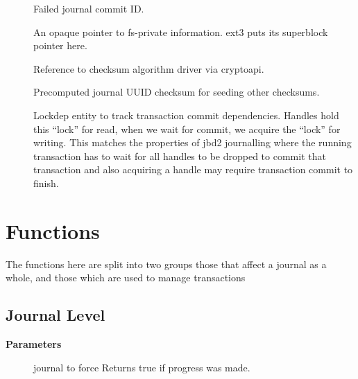 \documentclass[a4paper,8pt,english]{sphinxmanual}
\begin{document}
\begin{description}
\item[{}] \leavevmode
Failed journal commit ID.

\item[{}] \leavevmode
An opaque pointer to fs-private information.  ext3 puts its
superblock pointer here.

\item[{}] \leavevmode
Reference to checksum algorithm driver via cryptoapi.

\item[{}] \leavevmode
Precomputed journal UUID checksum for seeding other checksums.

\item[{}] \leavevmode
Lockdep entity to track transaction commit dependencies. Handles
hold this ``lock'' for read, when we wait for commit, we acquire the
``lock'' for writing. This matches the properties of jbd2 journalling
where the running transaction has to wait for all handles to be
dropped to commit that transaction and also acquiring a handle may
require transaction commit to finish.

\end{description}


\section{Functions}
\label{filesystems/index:functions}
The functions here are split into two groups those that affect a journal
as a whole, and those which are used to manage transactions


\subsection{Journal Level}
\label{filesystems/index:journal-level}

\begin{fulllineitems}
\label{filesystems/index:c.jbd2_journal_force_commit_nested}
\end{fulllineitems}


\textbf{Parameters}
\begin{description}
\item[{}] \leavevmode
journal to force
Returns true if progress was made.

\end{description}
\end{document}
